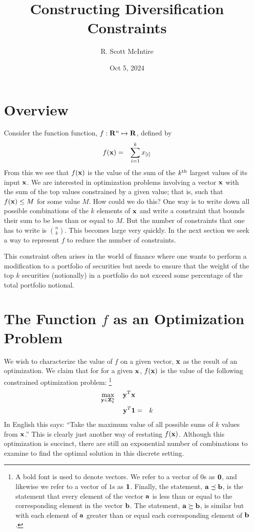 \documentclass[12pt]{article}
\title{Constructing Diversification Constraints}
\author{R. Scott McIntire}
\date{Oct 5, 2024}
\begin{document}
\maketitle

\section{Overview}
Consider the function function, $f: {\bf R}^n \mapsto {\bf R}$, defined by
\begin{eqnarray}
	f({\bf x}) & = & \sum_{i=1}^k x_{[i]} 
\end{eqnarray}
From this we see that $f({\bf x})$ is the value of the sum of the $k^{\rm th}$ 
largest values of its input ${\bf x}$.
We are interested in optimization problems involving a vector ${\bf x}$ 
with the sum of the top values constrained by a given value; that is, 
such that $f({\bf x}) \le M$  for some value $M$.
How could we do this? One way is to write down all possible combinations of the 
$k$ elements of ${\bf x}$ and write a constraint that bounds their sum to be 
less than or equal to $M$.  But the number of constraints that one has to 
write is $n \choose k$. This becomes large very quickly. 
In the next section we seek a way to represent $f$ to 
reduce the number of constraints.

This constraint often arises in the world of finance where one wants to perform
a modification to a portfolio of securities but needs to ensure that the 
weight of the top $k$ securities (notionally) in a portfolio do not 
exceed some percentage of the total portfolio notional.

\section{The Function $f$ as an Optimization Problem}
We wish to characterize the value of $f$ on a given vector, ${\bf x}$ as 
the result of an optimization.
We claim that for for a given ${\bf x}$, $f({\bf x})$ is the value of 
the following constrained optimization problem:%
\footnote{A bold font is used to denote vectors. We refer to a  
vector of $0$s as ${\bf 0}$, and likewise we refer to a vector of $1$s
as ${\bf 1}$. Finally, the statement, ${\bf a} \preceq {\bf b}$, is the 
statement that every element of the vector ${\bf a}$ is less than or equal
to the corresponding element in the vector ${\bf b}$. The statement,
${\bf a} \succeq {\bf b}$, is similar but with each element of ${\bf a}$
greater than or equal each corresponding element of ${\bf b}$.
}
\begin{eqnarray}
\mathop{\rm max}_{{\bf y} \in {\bf Z}_2^n}\limits \quad {\bf y}^T {\bf x} && \\
{\bf y}^T {\bf 1} & = & k 
\end{eqnarray}
In English this says: ``Take the maximum value of all possible sums of $k$ 
values from ${\bf x}$.'' This is clearly just another way of restating $f({\bf x})$.
Although this optimization is succinct, there are still an exponential number 
of combinations to examine to find the optimal solution in this discrete setting.
\end{document}
